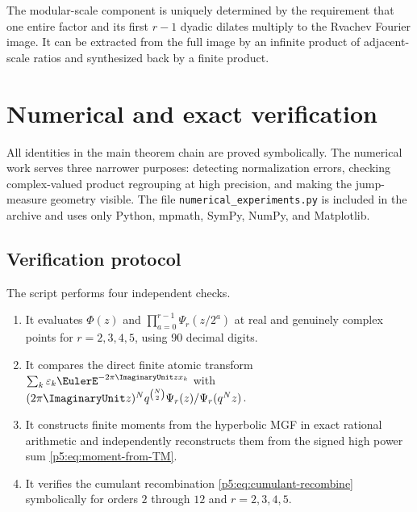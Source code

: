 \documentclass[11pt]{article}
\theoremstyle{definition}
\theoremstyle{remark}
\newcommand{\eps}{\varepsilon}
\begin{document}
\begin{resultboxPartiv}
The modular-scale component is uniquely determined by the requirement that one
entire factor and its first $r-1$ dyadic dilates multiply to the Rvachev
Fourier image.  It can be extracted from the full image by an infinite product
of adjacent-scale ratios and synthesized back by a finite product.
\end{resultboxPartiv}

\section{Numerical and exact verification}
\label{p5:sec:numerics}

All identities in the main theorem chain are proved symbolically.  The
numerical work serves three narrower purposes: detecting normalization errors,
checking complex-valued product regrouping at high precision, and making the
jump-measure geometry visible.  The file
\texttt{numerical\_experiments.py} is included in the archive and uses only
Python, mpmath, SymPy, NumPy, and Matplotlib.

\subsection{Verification protocol}

The script performs four independent checks.
\begin{enumerate}
\item It evaluates $\Phi(z)$ and
$\prod_{a=0}^{r-1}\Psi_r(z/2^a)$ at real and genuinely complex points for
$r=2,3,4,5$, using 90 decimal digits.
\item It compares the direct finite atomic transform
$\sum_k\eps_k\EulerE^{-2\pi\ImaginaryUnit zx_k}$\linebreak
with $(2\pi\ImaginaryUnit z)^Nq^{\binom N2}\Psi_r(z)/\Psi_r(q^Nz)$.
\item It constructs finite moments from the hyperbolic MGF in exact rational
arithmetic and independently reconstructs them from the signed high power sum
\eqref{p5:eq:moment-from-TM}.
\item It verifies the cumulant recombination
\eqref{p5:eq:cumulant-recombine} symbolically for orders $2$ through $12$ and
$r=2,3,4,5$.
\end{enumerate}
\end{document}
